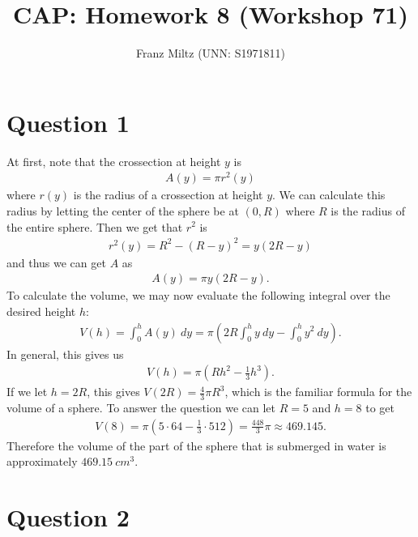 \documentclass{article}
\title{CAP: Homework 8 (Workshop 71)}
\author{Franz Miltz (UNN: S1971811)}
\begin{document}
\maketitle
\section*{Question 1}
At first, note that the crossection at height $y$ is
\begin{align*}
  A(y) = \pi r^2(y)
\end{align*}
where $r(y)$ is the radius of a crossection at height $y$. 
We can calculate this radius by letting the center of the sphere be at $(0, R)$ where $R$ is the radius of the entire sphere.
Then we get that $r^2$ is
\begin{align*}
  r^2(y) = R^2-(R-y)^2 = y(2R-y)
\end{align*}
and thus we can get $A$ as
\begin{align*}
  A(y) = \pi y(2R-y).
\end{align*}
To calculate the volume, we may now evaluate the following integral over the desired height $h$:
\begin{align*}
  V(h)=\int_0^h A(y)\:dy=\pi\left(2R\int_0^h y\:dy - \int_0^h y^2\:dy\right).
\end{align*}
In general, this gives us
\begin{align*}
  V(h)=\pi(Rh^2-\frac{1}{3}h^3).
\end{align*}
If we let $h=2R$, this gives $V(2R)=\frac{4}{3}\pi R^3$, which is the familiar formula for the volume of a sphere.
To answer the question we can let $R=5$ and $h=8$ to get
\begin{align*}
  V(8)=\pi(5\cdot 64-\frac{1}{3}\cdot 512) = \frac{448}{3}\pi\approx 469.145.
\end{align*}
Therefore the volume of the part of the sphere that is submerged in water is approximately $469.15\:cm^3$.
\section*{Question 2}
\end{document}
